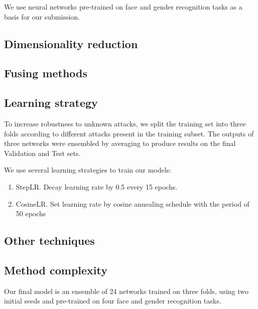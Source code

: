 \documentclass{article}
\begin{document}
We use neural networks pre-trained on face and gender recognition tasks as a basis for our submission.

\subsection{Dimensionality reduction}

\subsection{Fusing methods}


\subsection{Learning strategy}

To increase robustness to unknown attacks, we split the training set into three folds according to different attacks present in the training subset. 
The outputs of three networks were ensembled by averaging to produce results on the final Validation and Test sets.

\medskip
\noindent
We use several learning strategies to train our models:
\begin{enumerate}
	\item StepLR. Decay learning rate by 0.5 every 15 epochs.
	\item CosineLR. Set learning rate by cosine annealing schedule with the period of 50 epochs
\end{enumerate}

\subsection{Other techniques}

\subsection{Method complexity}
Our final model is an ensemble of 24 networks trained on three folds, using two initial seeds and pre-trained on four face and gender recognition tasks.
\end{document}
